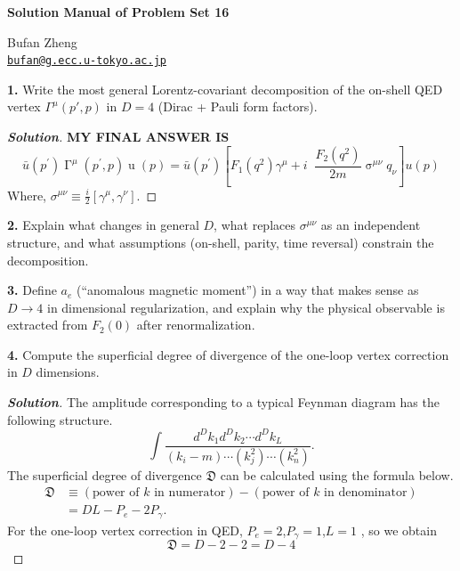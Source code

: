\documentclass[11pt]{article}
\newenvironment{solution}[1][]{\begin{proof}[\textbf{Solution}]}{\end{proof}}
\begin{document}
\begin{center}
    {\LARGE \textbf{Solution Manual of Problem Set 16} \par}
    \vspace{1em}
    {\large Bufan Zheng\\ \href{mailto:bufan@g.ecc.u-tokyo.ac.jp}{\texttt{bufan@g.ecc.u-tokyo.ac.jp}} \par}
\end{center}

\begin{tcolorbox}[problem]
\textbf{1.} Write the most general Lorentz-covariant decomposition of the on-shell QED vertex $\Gamma^\mu(p',p)$ in $D=4$ (Dirac + Pauli form factors).
\end{tcolorbox}
\begin{solution}[16.1]
	\textbf{MY FINAL ANSWER IS}
	\[
\boxed{\bar{u}(p^{\prime})\operatorname{\Gamma}^\mu(p^{\prime},p)\operatorname{u}(p)=\bar{u}(p^{\prime})\left[F_1(q^2)\gamma^\mu+i\operatorname{}\frac{F_2(q^2)}{2m}\operatorname{\sigma}^{\mu\nu}q_\nu\right]u(p)}
	\]
	Where, $\sigma^{\mu\nu}\equiv\frac{i}{2}[\gamma^\mu,\gamma^\nu]$.
\end{solution}

\begin{tcolorbox}[problem]
\textbf{2.} Explain what changes in general $D$, what replaces $\sigma^{\mu\nu}$ as an independent structure, and what assumptions (on-shell, parity, time reversal) constrain the decomposition.
\end{tcolorbox}

\begin{tcolorbox}[problem]
\textbf{3.} Define $a_e$ (``anomalous magnetic moment'') in a way that makes sense as $D\to 4$ in dimensional regularization, and explain why the physical observable is extracted from $F_2(0)$ after renormalization.
\end{tcolorbox}

\begin{tcolorbox}[problem]
\textbf{4.} Compute the superficial degree of divergence of the one-loop vertex correction in $D$ dimensions.
\end{tcolorbox}
\begin{solution}[16.4]
	The amplitude corresponding to a typical Feynman diagram has the following structure. 
	\[
\int\frac{d^Dk_1d^Dk_2\cdots d^Dk_L}{(k_i-m)\cdots(k_j^2)\cdots(k_n^2)}.
	\]
	The superficial degree of divergence $\mathfrak{D}$ can be calculated using the formula below. 
	\[
	\begin{aligned}\mathfrak{D}&\equiv(\text{power of }k\text{ in numerator})-(\text{power of }k\text{ in denominator})\\&=DL-P_e-2P_\gamma.\end{aligned}
	\]
	For the one-loop vertex correction in QED, $P_e=2$,$P_\gamma=1$,$L=1$ , so we obtain
	\[
	\boxed{
	\mathfrak{D}= D-2-2=D-4}
	\]
\end{solution}
\end{document}
